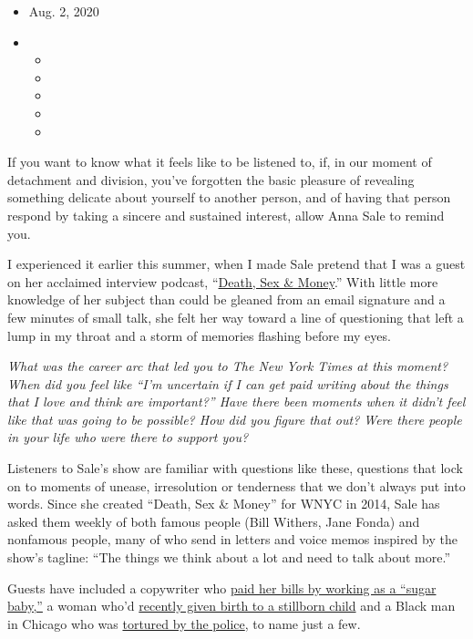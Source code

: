 \begin{itemize}
\item
  Aug. 2, 2020
\item
  \begin{itemize}
  \item
  \item
  \item
  \item
  \item
  \end{itemize}
\end{itemize}

If you want to know what it feels like to be listened to, if, in our
moment of detachment and division, you've forgotten the basic pleasure
of revealing something delicate about yourself to another person, and of
having that person respond by taking a sincere and sustained interest,
allow Anna Sale to remind you.

I experienced it earlier this summer, when I made Sale pretend that I
was a guest on her acclaimed interview podcast,
``\href{https://www.wnycstudios.org/podcasts/deathsexmoney}{Death, Sex
\& Money}.'' With little more knowledge of her subject than could be
gleaned from an email signature and a few minutes of small talk, she
felt her way toward a line of questioning that left a lump in my throat
and a storm of memories flashing before my eyes.

\emph{What was the career arc that led you to The New York Times at this
moment? When did you feel like ``I'm uncertain if I can get paid writing
about the things that I love and think are important?'' Have there been
moments when it didn't feel like that was going to be possible? How did
you figure that out? Were there people in your life who were there to
support you?}

Listeners to Sale's show are familiar with questions like these,
questions that lock on to moments of unease, irresolution or tenderness
that we don't always put into words. Since she created ``Death, Sex \&
Money'' for WNYC in 2014, Sale has asked them weekly of both famous
people (Bill Withers, Jane Fonda) and nonfamous people, many of who send
in letters and voice memos inspired by the show's tagline: ``The things
we think about a lot and need to talk about more.''

Guests have included a copywriter who
\href{https://www.wnycstudios.org/podcasts/deathsexmoney/episodes/seeking-arrangement-sugar-daddy-death-sex-money}{paid
her bills by working as a ``sugar baby,''} a woman who'd
\href{https://www.wnycstudios.org/podcasts/deathsexmoney/episodes/stillbirth-death-sex-money}{recently
given birth to a stillborn child} and a Black man in Chicago who was
\href{https://www.wnycstudios.org/podcasts/deathsexmoney/episodes/darrell-cannon-2020-death-sex-money}{tortured
by the police}, to name just a few.

